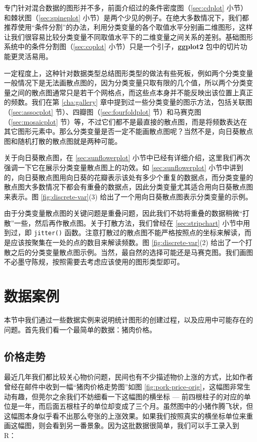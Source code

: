 \documentclass[
  b5paper,
  UTF8,twoside]{book}
\begin{document}
专门针对混合数据的图形并不多，前面介绍过的条件密度图（\ref{sec:cdplot} 小节）和棘状图（\ref{sec:spineplot} 小节）是两个少见的例子。在绝大多数情况下，我们都推荐使用``条件分割''的办法，利用分类变量的各个取值水平分别画二维图形，这样让我们很容易比较分类变量不同取值水平下的二维变量之间关系的差别。基础图形系统中的条件分割图（\ref{sec:coplot} 小节）只是一个引子，\textbf{ggplot2} 包中的切片功能更灵活易用。

一定程度上，这种针对数据类型总结图形类型的做法有些死板，例如两个分类变量一般情况下是无法画散点图的，因为分类变量只取有限的几个值，所以两个分类变量之间的散点图通常只是若干个网格点，而这些点本身并不能反映出该位置上真正的频数。我们在第 \ref{cha:gallery} 章中提到过一些分类变量的图示方法，包括关联图（\ref{sec:assocplot} 节）、四瓣图（\ref{sec:fourfoldplot} 节）和马赛克图（\ref{sec:mosaicplot} 节）等，不过它们都不是最直接的散点图，而是将频数表达在其它图形元素中。那么分类变量是否一定不能画散点图呢？当然不是，向日葵散点图和随机打散的散点图就是两种可能。

关于向日葵散点图，在 \ref{sec:sunflowerplot} 小节中已经有详细介绍，这里我们再次强调一下它在展示分类变量散点图上的功效。如 \ref{sec:sunflowerplot} 小节中讲到的，向日葵散点图用向日葵的花瓣表示该处有多少个重复的数据点，而分类变量的散点图大多数情况下都会有重叠的数据点，因此分类变量尤其适合用向日葵散点图来表示。图 \ref{fig:discrete-var}(3) 给出了一个用向日葵散点图表示分类变量的示例。

由于分类变量散点图的关键问题是重叠问题，因此我们不妨将重叠的数据稍微``打散''一些，然后再作散点图。关于打散方法，我们曾经在 \ref{sec:stripchart} 小节中用到过，即 \texttt{jitter()} 函数。注意打散过的散点图不能严格按照点的坐标来解读，而是应该按聚集在一处的点的数目来解读频数。图 \ref{fig:discrete-var}(2) 给出了一个打散之后的分类变量散点图示例。当然，最自然的选择可能还是马赛克图。我们画图不必墨守陈规，按照需要去考虑应该使用的图形类型即可。

\section{数据案例}\label{sec:data-case}

本节中我们通过一些数据实例来说明统计图形的创建过程，以及应用中可能存在的问题。首先我们看一个最简单的数据：猪肉价格。

\subsection{价格走势}\label{ux4ef7ux683cux8d70ux52bf}

最近几年我们都比较关心物价问题，民间也有不少描述物价上涨的方式，比如作者曾经在邮件中收到一幅``猪肉价格走势图''如图 \ref{fig:pork-price-orig}，这幅图非常生动有趣，但莞尔之余我们不妨细看一下这幅图的横坐标 --- 前四根柱子的对应的单位是一年，而后面五根柱子的单位却变成了三个月。虽然图中的小猪作腾飞状，但这幅图本身似乎看不出那么夸张的上涨效果。如果我们按照真实的横坐标单位来重画这幅图，则会看到另一番景象。因为这批数据很简单，我们可以手工录入到 R：
\end{document}
